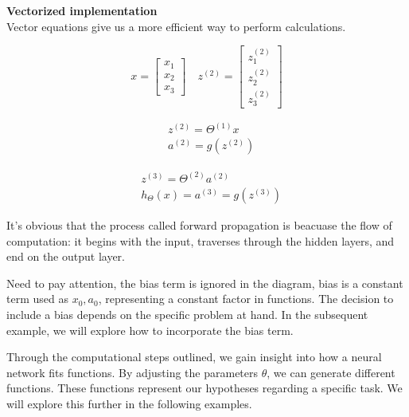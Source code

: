 \documentclass{article}
\begin{document}
    \begin{mdframed}[hidealllines=false,backgroundcolor=white!20]
        \textbf{Vectorized implementation}\\

        Vector equations give us a more efficient way to perform calculations.


        \begin{equation}
        x=\left[\begin{array}{l} x_1 \\ x_2 \\ x_3\end{array}\right] \quad z^{(2)}=\left[\begin{array}{c}z_1^{(2)} \\ z_2^{(2)} \\ z_3^{(2)}\end{array}\right]
        \end{equation}

        \begin{equation}
        \begin{aligned} & z^{(2)}=\Theta^{(1)} x \\ & a^{(2)}=g\left(z^{(2)}\right)\end{aligned}
        \end{equation}

        \begin{equation}
        \begin{aligned}
        & z^{(3)}=\Theta^{(2)} a^{(2)} \\
        & h_{\Theta}(x)=a^{(3)}=g\left(z^{(3)}\right)
        \end{aligned}
        \end{equation}

        \hspace*{\fill}

    \end{mdframed}

    It's obvious that the process called forward propagation is beacuase the flow of computation: it begins with the input, traverses through the hidden layers, and end on the output layer.

Need to pay attention, the bias term is ignored in the diagram, bias is a constant term used as $x_0, a_0$, representing a constant factor in functions. The decision to include a bias depends on the specific problem at hand. In the subsequent example, we will explore how to incorporate the bias term.

Through the computational steps outlined, we gain insight into how a neural network fits functions. By adjusting the parameters $\theta$, we can generate different functions. These functions represent our hypotheses regarding a specific task.  We will explore this further in the following examples.
\end{document}
